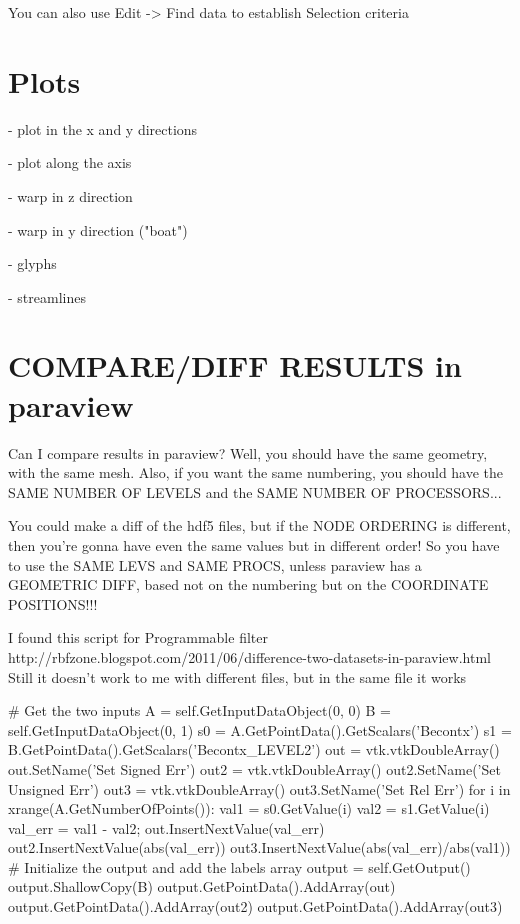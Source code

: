 \documentclass[10pt]{book}
\begin{document}
 You can also use Edit -> Find data to establish Selection criteria
 
 
 \chapter{Plots}
 
- plot in the x and y directions

- plot along the axis

- warp in z direction

- warp in y direction ("boat")

- glyphs

- streamlines


\chapter{COMPARE/DIFF RESULTS  in paraview}

Can I compare results in paraview?
Well, you should have the same geometry, with the same mesh.
Also, if you want the same numbering,
you should have the SAME NUMBER OF LEVELS 
and the SAME NUMBER OF PROCESSORS...

You could make a diff of the hdf5 files, but if the NODE ORDERING 
is different, then you're gonna have even the same values but in 
different order!
So you have to use the SAME LEVS and SAME PROCS,
unless paraview has a GEOMETRIC DIFF, based not on the numbering 
but on the COORDINATE POSITIONS!!!

I found this script for Programmable filter
http://rbfzone.blogspot.com/2011/06/difference-two-datasets-in-paraview.html
Still it doesn't work to me with different files, but in the same file it works


\# Get the two inputs
A = self.GetInputDataObject(0, 0)
B = self.GetInputDataObject(0, 1)
s0 = A.GetPointData().GetScalars('Becontx')
s1 = B.GetPointData().GetScalars('Becontx\_LEVEL2')
out = vtk.vtkDoubleArray()
out.SetName('Set Signed Err')
out2 = vtk.vtkDoubleArray()
out2.SetName('Set Unsigned Err')
out3 = vtk.vtkDoubleArray()
out3.SetName('Set Rel Err')
for i in xrange(A.GetNumberOfPoints()):
    val1 = s0.GetValue(i)
    val2 = s1.GetValue(i)
    val\_err = val1 - val2;
    out.InsertNextValue(val\_err)
    out2.InsertNextValue(abs(val\_err))
    out3.InsertNextValue(abs(val\_err)/abs(val1))
\# Initialize the output and add the labels array
output = self.GetOutput()
output.ShallowCopy(B)
output.GetPointData().AddArray(out)
output.GetPointData().AddArray(out2)
output.GetPointData().AddArray(out3)
\end{document}
